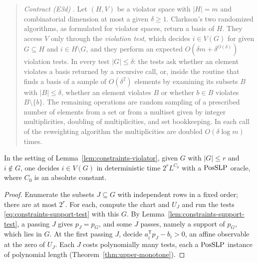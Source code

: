 \begin{quote}
\emph{Contract (E3d)} \citep[Theorem~27 and Sections~4.2--4.5]{GaertnerMatousekRuestSkovron2008}.
Let $(H,V)$ be a violator space with $|H|=m$ and combinatorial dimension at
most a given $\delta\ge1$. Clarkson's two randomized algorithms, as formulated
for violator spaces, return a basis of $H$. They access $V$ only through the
\emph{violation test}, which decides $i\in V(G)$ for given $G\subseteq H$ and
$i\in H\setminus G$, and they perform an expected $O(\delta m+\delta^{O(\delta)})$
violation tests. In every test $|G|\le\delta$: the tests ask whether an element
violates a basis returned by a recursive call, or, inside the routine that
finds a basis of a sample of $O(\delta^2)$ elements by examining its subsets
$B$ with $|B|\le\delta$, whether an element violates $B$ or whether $b\in B$
violates $B\setminus\{b\}$. The remaining operations are random sampling of a
prescribed number of elements from a set or from a multiset given by integer
multiplicities, doubling of multiplicities, and set bookkeeping. In each call
of the reweighting algorithm the multiplicities are doubled $O(\delta\log m)$
times.
\end{quote}

\begin{lemma}
\label{lem:constraints-rank-primitive}
In the setting of Lemma~\ref{lem:constraints-violator}, given $G$ with
$|G|\le r$ and $i\notin G$, one decides $i\in V(G)$ in deterministic time
$2^rL^{C_0}$ with a $\mathrm{PosSLP}$ oracle, where $C_0$ is an absolute constant.
\end{lemma}

\begin{proof}
Enumerate the subsets $J\subseteq G$ with independent rows in a fixed order;
there are at most $2^r$. For each, compute the chart and $U_J$ and run the
tests \eqref{eq:constraints-support-test} with this $G$. By
Lemma~\ref{lem:constraints-support-test}, a passing $J$ gives $p_J=p_G$, and
some $J$ passes, namely a support of $p_G$, which lies in $G$. At the first
passing $J$, decide $a_i^{\mathsf T}p_J-b_i>0$, an affine observable at the
zero of $U_J$. Each $J$ costs polynomially many tests, each a $\mathrm{PosSLP}$
instance of polynomial length (Theorem~\ref{thm:upper-monotone}).
\end{proof}

